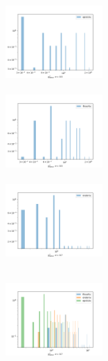 \documentclass[10pt,a4paper,onecolumn]{article}
\theoremstyle{definition}
\theoremstyle{remark}
\begin{document}
\begin{figure}[htpb!]
	\centering
	\begin{multicols}{3}
		\includegraphics[width=0.33\textwidth]{graficos/histograma1_epistola.png} \\ \vspace{0.15cm}  \\
		\includegraphics[width=0.33\textwidth]{graficos/histograma1_filosofia.png} \\ \vspace{0.15cm}  \\
		\includegraphics[width=0.33\textwidth]{graficos/histograma1_oratoria.png} \\ \vspace{0.15cm}  \\ 
	\end{multicols}
	\begin{multicols}{3}
		\includegraphics[width=0.33\textwidth]{graficos/histograma3_epistola.png} \\ \vspace{0.15cm}  \\

\end{multicols}
\end{figure}
\end{document}
